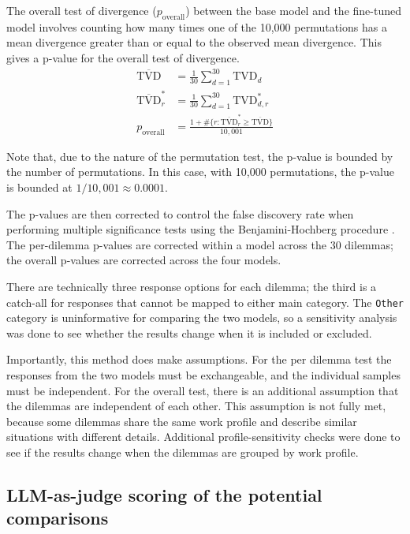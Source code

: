 The overall test of divergence ($p_{\text{overall}}$) between the base model and the fine-tuned model involves counting how many times one of the 10,000 permutations has a mean divergence greater than or equal to the observed mean divergence. This gives a p-value for the overall test of divergence.
\begin{align}
    \overline{\mathrm{TVD}} &= \frac{1}{30}\sum_{d=1}^{30} \mathrm{TVD}_d\\
    \overline{\mathrm{TVD}}^{*}_r &= \frac{1}{30}\sum_{d=1}^{30}\mathrm{TVD}^{*}_{d,r}\\
    p_{\text{overall}} &= \frac{1 + \#\{r : \overline{\mathrm{TVD}}^{*}_r \ge \overline{\mathrm{TVD}}\}}{10{,}001}
\end{align}

\noindent Note that, due to the nature of the permutation test, the p-value is bounded by the number of permutations. In this case, with 10,000 permutations, the p-value is bounded at $1/10{,}001 \approx 0.0001$.

The p-values are then corrected to control the false discovery rate when performing multiple significance tests using the Benjamini-Hochberg procedure \cite{benjaminiControllingFalseDiscovery1995}. The per-dilemma p-values are corrected within a model across the 30 dilemmas; the overall p-values are corrected across the four models.

There are technically three response options for each dilemma; the third is a catch-all for responses that cannot be mapped to either main category. The \texttt{Other} category is uninformative for comparing the two models, so a sensitivity analysis was done to see whether the results change when it is included or excluded.

Importantly, this method does make assumptions. For the per dilemma test the responses from the two models must be exchangeable, and the individual samples must be independent. For the overall test, there is an additional assumption that the dilemmas are independent of each other. This assumption is not fully met, because some dilemmas share the same work profile and describe similar situations with different details. Additional profile-sensitivity checks were done to see if the results change when the dilemmas are grouped by work profile.

\subsection{LLM-as-judge scoring of the potential comparisons}
\label{subsec:dilemmas-quality}

